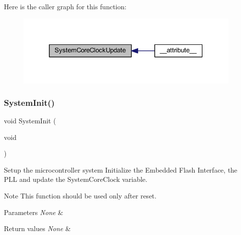 Here is the caller graph for this function\+:
\nopagebreak
\begin{figure}[H]
\begin{center}
\leavevmode
\includegraphics[width=315pt]{group___s_t_m32_f10x___system___private___functions_gae0c36a9591fe6e9c45ecb21a794f0f0f_icgraph}
\end{center}
\end{figure}
\mbox{\label{group___s_t_m32_f10x___system___private___functions_ga93f514700ccf00d08dbdcff7f1224eb2}} 
\subsubsection{\texorpdfstring{System\+Init()}{SystemInit()}}
{\footnotesize\ttfamily void System\+Init (\begin{DoxyParamCaption}\item[{void}]{ }\end{DoxyParamCaption})}



Setup the microcontroller system Initialize the Embedded Flash Interface, the P\+LL and update the System\+Core\+Clock variable. 

\begin{DoxyNote}{Note}
This function should be used only after reset. 
\end{DoxyNote}

\begin{DoxyParams}{Parameters}
{\em None} & \\
\hline
\end{DoxyParams}

\begin{DoxyRetVals}{Return values}
{\em None} & \\
\hline
\end{DoxyRetVals}


